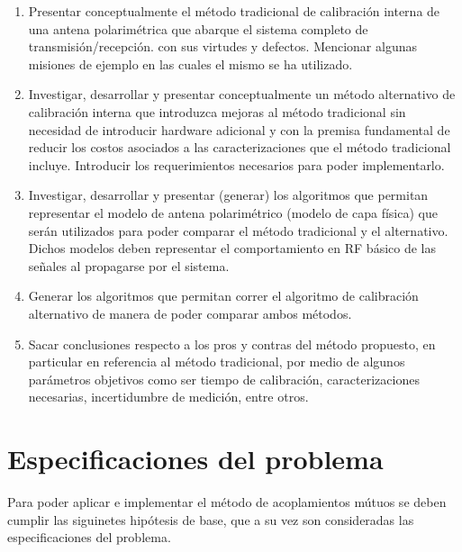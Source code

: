 \begin{enumerate}
    \item Presentar conceptualmente el método tradicional de calibración interna de una antena polarimétrica que abarque el 
			sistema completo de transmisión/recepción. con sus virtudes y defectos. Mencionar algunas misiones de ejemplo en
			las cuales el mismo se ha utilizado.
    \item Investigar, desarrollar y presentar conceptualmente un método alternativo de calibración interna que introduzca 
			mejoras al método tradicional sin necesidad de introducir hardware adicional y con la premisa fundamental de 
			reducir los costos asociados a las caracterizaciones que el método tradicional incluye. Introducir los 
			requerimientos necesarios para poder implementarlo.
    \item Investigar, desarrollar y presentar (generar) los algoritmos que permitan representar el modelo de antena 
			polarimétrico (modelo de capa física) que serán utilizados para poder comparar el método tradicional y el 
			alternativo. Dichos modelos deben representar el comportamiento en RF básico de las señales al propagarse por el 
			sistema.
    \item Generar los algoritmos que permitan correr el algoritmo de calibración alternativo de manera de poder comparar ambos 
			métodos.
    \item Sacar conclusiones respecto a los pros y contras del método propuesto, en particular en referencia al método 
			tradicional, por medio de algunos parámetros objetivos como ser tiempo de calibración, caracterizaciones necesarias, 
			incertidumbre de medición, entre otros.
\end{enumerate}    


\section{Especificaciones del problema}

Para poder aplicar e implementar el método de acoplamientos mútuos se deben cumplir las siguinetes hipótesis de base, que a su 
vez son consideradas las especificaciones del problema.

